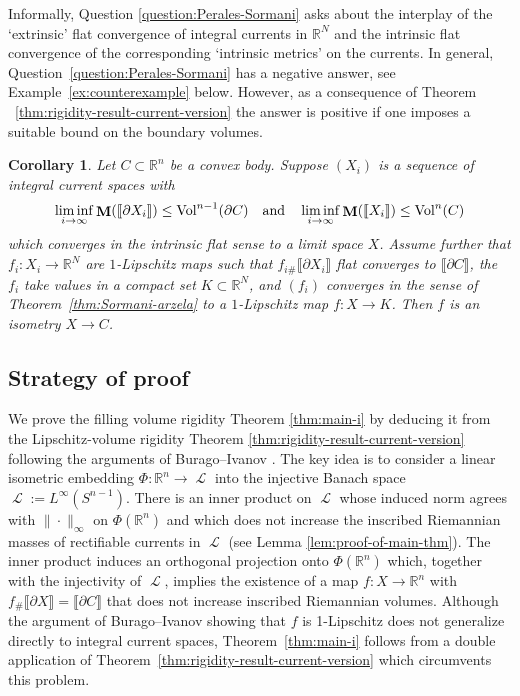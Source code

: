 \documentclass[reqno]{amsart}
\newtheorem{corollary}[theorem]{Corollary}
\numberwithin{equation}{section}
\newcommand{\R}{\mathbb{R}}
\newcommand{\vol}{\operatorname{Vol}}
\newcommand{\bb}[1]{\llbracket #1\rrbracket}
\newcommand{\susbet}{\subset}
\DeclareMathOperator{\mass}{\mathbf{M}}
\DeclareMathOperator{\Ell}{\mathscr{L}}
\begin{document}
Informally, Question \ref{question:Perales-Sormani} asks about the interplay of the `extrinsic' flat convergence of integral currents in $\mathbb{R}^N$ and the intrinsic flat convergence of the corresponding `intrinsic metrics' on the currents.  In general, Question~\ref{question:Perales-Sormani} has a negative answer, see Example~\ref{ex:counterexample} below. However, as a consequence of Theorem ~\ref{thm:rigidity-result-current-version} the answer is positive if one 
imposes a suitable bound on the boundary volumes.
\begin{corollary}\label{prop:answer-to-sormani-perales}
Let $C\subset \R^n$ be a convex body. Suppose \((X_i)\) is a sequence of integral current spaces with
\[
\liminf_{i\to \infty} \mass(\bb{\partial X_i}) \leq \vol^{n-1}(\partial C) \quad \textnormal{and}\quad \liminf_{i\to \infty} \mass(\bb{X_i}) \leq \vol^n(C)
\]
which converges in the intrinsic flat sense to a limit space $X$. Assume further that \(f_i \colon X_i \to \R^N\) are \(1\)-Lipschitz maps such that \(f_{i\#}\bb{\partial X_i}\) flat converges to \(\bb{\partial C}\), the \(f_i\) take values in a compact set \(K\susbet \R^N\), and \((f_i)\) converges in the sense of Theorem~\ref{thm:Sormani-arzela} to a \(1\)-Lipschitz map \(f\colon X\to K\). Then \(f\) is an isometry \(X \to C\). 
\end{corollary}

\subsection{Strategy of proof} We prove the filling volume rigidity Theorem \ref{thm:main-i} by deducing it from the Lipschitz-volume rigidity Theorem \ref{thm:rigidity-result-current-version} following the arguments of Burago--Ivanov \cite{bi10,bi13}. The key idea is to consider a linear isometric embedding $\Phi\colon\R^n\to \Ell$ into the injective Banach space $\Ell:=L^{\infty}(S^{n-1})$. There is an inner product on $\Ell$ whose induced norm agrees with $\|\cdot\|_\infty$ on $\Phi(\R^n)$ and which does not increase the inscribed Riemannian masses of rectifiable currents in $\Ell$ (see Lemma \ref{lem:proof-of-main-thm}). The inner product induces an orthogonal projection onto $\Phi(\mathbb{R}^n)$ which, together with the injectivity of $\Ell$,  implies the existence of a map $f\colon X \to \mathbb{R}^n$ with $f_{\#} \bb{\partial X}=\bb{\partial C}$ that does not increase inscribed Riemannian volumes.  Although the argument of Burago--Ivanov showing that $f$ is 1-Lipschitz does not generalize directly to integral current spaces, Theorem~\ref{thm:main-i} follows from a double application of Theorem~\ref{thm:rigidity-result-current-version} which circumvents this problem.
\end{document}
